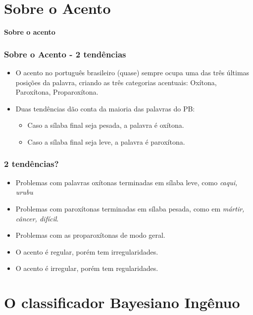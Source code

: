 \documentclass[xcolor=table]{beamer}
\begin{document}

	\section{Sobre o Acento}
	\begin{frame}
		\centering \textbf{Sobre o acento\\}
	\end{frame}
	\begin{frame}
		\frametitle{Sobre o Acento - 2 tendências}
		\begin{itemize}
			\item O acento no português brasileiro (quase) sempre ocupa uma das três últimas posições da palavra, criando as três categorias acentuais: Oxítona, Paroxítona, Proparoxítona.
			\item Duas tendências dão conta da maioria das palavras do PB:
			\begin{itemize}
				\item Caso a sílaba final seja pesada, a palavra é oxítona.\\
				\item Caso a sílaba final seja leve, a palavra é paroxítona.\\
			\end{itemize}
		\end{itemize}
	\end{frame}
	\begin{frame}
		\frametitle{2 tendências?}
		\begin{itemize}
			\item Problemas com palavras oxítonas terminadas em sílaba leve, como \textit{caqui, urubu}\\
			\item Problemas com paroxítonas terminadas em sílaba pesada, como em \textit{mártir, câncer, difícil}.\\
			\item Problemas com as proparoxítonas de modo geral.\\
			\item O acento é regular, porém tem irregularidades.\\
			\item O acento é irregular, porém tem regularidades.\\
		\end{itemize}

	\end{frame}	
	\section{O classificador Bayesiano Ingênuo}
	
\end{document}
